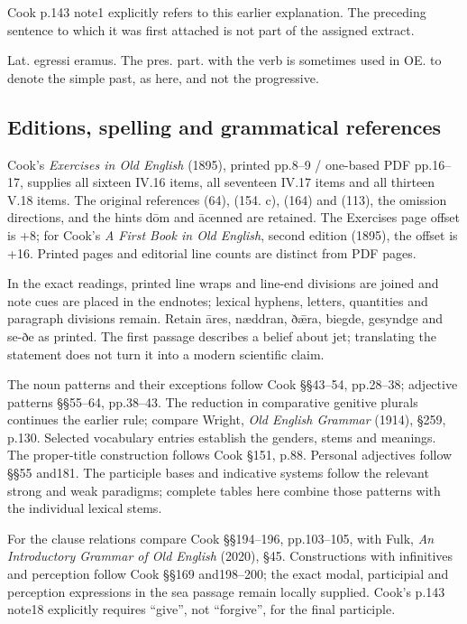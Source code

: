 Cook p.143 note1 explicitly refers to this earlier explanation. The preceding sentence to which it was first attached is not part of the assigned extract.

Lat. egressi eramus. The pres. part. with the verb is sometimes used in OE. to denote the simple past, as here, and not the progressive.

\subsection*{Editions, spelling and grammatical references}

Cook’s \emph{Exercises in Old English} (1895), printed pp.8–9 /\allowbreak{} one-based PDF pp.16–17, supplies all sixteen IV.16 items, all seventeen IV.17 items and all thirteen V.18 items. The original references (64), (154. c), (164) and (113), the omission directions, and the hints dōm and ācenned are retained. The Exercises page offset is +8; for Cook’s \emph{A First Book in Old English}, second edition (1895), the offset is +16. Printed pages and editorial line counts are distinct from PDF pages.

In the exact readings, printed line wraps and line-end divisions are joined and note cues are placed in the endnotes; lexical hyphens, letters, quantities and paragraph divisions remain. Retain āres, næddran, ðǣra, biegde, gesyndge and se-ðe as printed. The first passage describes a belief about jet; translating the statement does not turn it into a modern scientific claim.

The noun patterns and their exceptions follow Cook §§43–54, pp.28–38; adjective patterns §§55–64, pp.38–43. The reduction in comparative genitive plurals continues the earlier rule; compare Wright, \emph{Old English Grammar} (1914), §259, p.130. Selected vocabulary entries establish the genders, stems and meanings. The proper-title construction follows Cook §151, p.88. Personal adjectives follow §§55 and181. The participle bases and indicative systems follow the relevant strong and weak paradigms; complete tables here combine those patterns with the individual lexical stems.

For the clause relations compare Cook §§194–196, pp.103–105, with Fulk, \emph{An Introductory Grammar of Old English} (2020), §45. Constructions with infinitives and perception follow Cook §§169 and198–200; the exact modal, participial and perception expressions in the sea passage remain locally supplied. Cook’s p.143 note18 explicitly requires “give”, not “forgive”, for the final participle.

\endgroup

\par\label{end-ch11-learner}
\clearpage\endgroup
